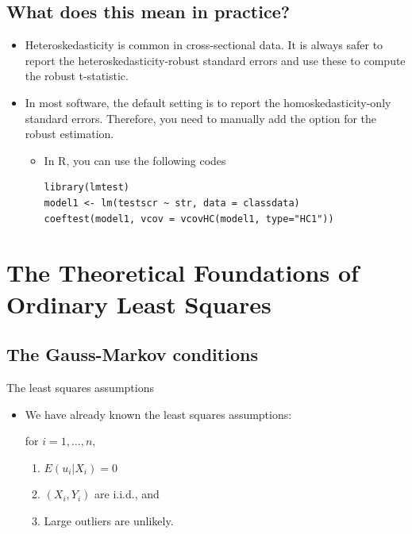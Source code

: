 \documentclass[presentation]{beamer}
\begin{document}
\subsection*{What does this mean in practice?}
\label{sec:orgffd09b2}

\begin{itemize}
\item Heteroskedasticity is common in cross-sectional data. It is always
safer to report the heteroskedasticity-robust standard errors and
use these to compute the robust t-statistic.

\item In most software, the default setting is to report the
homoskedasticity-only standard errors. Therefore, you need to
manually add the option for the robust estimation.

\begin{itemize}
\item In R, you can use the following codes
\begin{verbatim}
library(lmtest)
model1 <- lm(testscr ~ str, data = classdata)
coeftest(model1, vcov = vcovHC(model1, type="HC1"))
\end{verbatim}
\end{itemize}
\end{itemize}




\section*{The Theoretical Foundations of Ordinary Least Squares}
\label{sec:orgfa112f2}

\subsection*{The Gauss-Markov conditions}
\label{sec:org2d9de27}

\begin{frame}[label={sec:org11d293d}]{The least squares assumptions}
\begin{itemize}
\item We have already known the least squares assumptions: 

for \(i = 1, \ldots, n\), 

\begin{enumerate}
\item \(E(u_i|X_i) = 0\)
\item \((X_i, Y_i)\) are i.i.d., and
\item Large outliers are unlikely.
\end{enumerate}
\end{itemize}
\end{frame}
\end{document}
